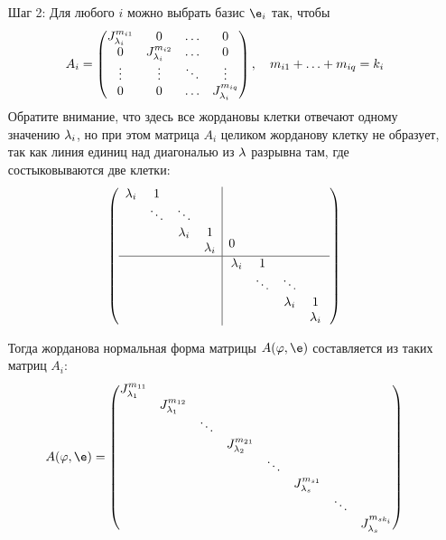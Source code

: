 \begin{itemize}
\item[Шаг 2:] Для любого $i$ можно выбрать базис $\e_i$ так, чтобы
\begin{gather*}
A_i = 
\begin{pmatrix*}
J_{\l_i}^{m_{i1}} & 0 & \ldots & 0 \\
0 & J_{\l_i}^{m_{i2}} & \ldots & 0 \\
\vdots & \vdots & \ddots & \vdots \\
0 & 0 & \ldots & J_{\l_i}^{m_{iq}}
\end{pmatrix*}, \quad m_{i1} + \ldots + m_{iq} = k_i
\end{gather*}
Обратите внимание, что здесь все жордановы клетки отвечают одному значению $\lambda_i$, но при этом матрица $A_i$ целиком жорданову клетку не образует, так как линия единиц над диагональю из $\lambda$ разрывна там, где состыковываются две клетки:
\begin{gather*}
\begin{pmatrix*}
\begin{array}{c|c}
\begin{matrix}
\l_i & 1 \\
&  \ddots & \ddots\\
&  & \l_i & 1 \\
&  &  & \l_i
\end{matrix} & 
\begin{matrix}
\\
\\
\\
0&&&&&&&
\end{matrix}
\\ \hline & 
\begin{matrix}
\l_i & 1 \\
&  \ddots & \ddots\\
&  & \l_i & 1 \\
&  &  & \l_i
\end{matrix}
\end{array}
\end{pmatrix*}
\end{gather*}

Тогда жорданова нормальная форма матрицы $A(\phi, \e)$ составляется из таких матриц $A_i$: 
\setcounter{MaxMatrixCols}{13}
\begin{gather*}
A(\phi, \e) = 
\begin{pmatrix*}
J_{\l_1}^{m_{11}} \\
& J_{\l_1}^{m_{12}} \\
&&\ddots\\
&&& J_{\l_2}^{m_{21}} \\
&&&& \ddots \\
&&&&& J_{\l_s}^{m_{s1}} \\
&&&&&& \ddots \\
&&&&&&& J_{\l_s}^{m_{sk_i}}
\end{pmatrix*}
\end{gather*}


\end{itemize}
